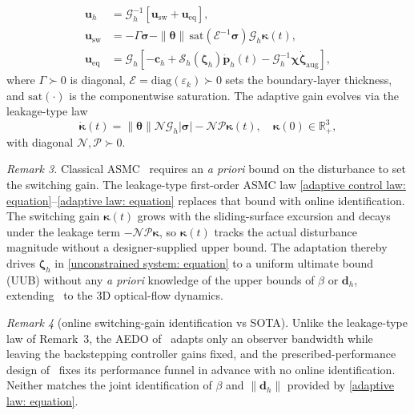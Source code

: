 \documentclass{IEEEtaes}
\begin{document}
\begin{align} \label{adaptive control law: equation}
    \boldsymbol{u}_h &= \mathcal{G}_h^{-1}[\boldsymbol{u}_\text{sw}+\boldsymbol{u}_\text{eq}],\nonumber\\
    \boldsymbol{u}_\text{sw} &= -\Gamma\boldsymbol{\sigma} - \|\boldsymbol{\theta}\|\,\text{sat}(\mathcal{E}^{-1}\boldsymbol{\sigma})\mathcal{G}_h\boldsymbol{\kappa}(t),\\
    \boldsymbol{u}_\text{eq} &= \mathcal{G}_h\!\left[-\boldsymbol{c}_h+\mathcal{S}_h(\boldsymbol{\zeta}_h)\dot{\boldsymbol{p}}_h(t)-\mathcal{G}_h^{-1}\boldsymbol{\chi}\dot{\boldsymbol{\zeta}}_\text{aug}\right],\nonumber
\end{align}
where $\Gamma\succ 0$ is diagonal, $\mathcal{E}=\text{diag}(\varepsilon_k)\succ 0$ sets the boundary-layer thickness, and $\text{sat}(\cdot)$ is the componentwise saturation. The adaptive gain evolves via the leakage-type law
\begin{equation} \label{adaptive law: equation}
    \dot{\boldsymbol{\kappa}}(t) = \|\boldsymbol{\theta}\|\mathcal{N}\mathcal{G}_h|\boldsymbol{\sigma}| - \mathcal{N}\mathcal{P}\boldsymbol{\kappa}(t),\quad\boldsymbol{\kappa}(0)\in\mathbb{R}_+^3,
\end{equation}
with diagonal $\mathcal{N},\mathcal{P}\succ 0$.

\textit{Remark 3.} Classical ASMC~\cite{roy2020} requires an \emph{a priori} bound on the disturbance to set the switching gain. The leakage-type first-order ASMC law \eqref{adaptive control law: equation}--\eqref{adaptive law: equation} replaces that bound with online identification. The switching gain $\boldsymbol{\kappa}(t)$ grows with the sliding-surface excursion and decays under the leakage term $-\mathcal{N}\mathcal{P}\boldsymbol{\kappa}$, so $\boldsymbol{\kappa}(t)$ tracks the actual disturbance magnitude without a designer-supplied upper bound. The adaptation thereby drives $\boldsymbol{\zeta}_h$ in \eqref{unconstrained system: equation} to a uniform ultimate bound (UUB) without any \emph{a priori} knowledge of the upper bounds of $\beta$ or $\boldsymbol{d}_h$, extending~\cite{singhal2025} to the 3D optical-flow dynamics.

\textit{Remark 4} (online switching-gain identification vs SOTA). Unlike the leakage-type law of Remark~3, the AEDO of~\cite{zhang2026} adapts only an observer bandwidth while leaving the backstepping controller gains fixed, and the prescribed-performance design of~\cite{lin2023} fixes its performance funnel in advance with no online identification. Neither matches the joint identification of $\beta$ and $\|\boldsymbol{d}_h\|$ provided by \eqref{adaptive law: equation}.
\end{document}
